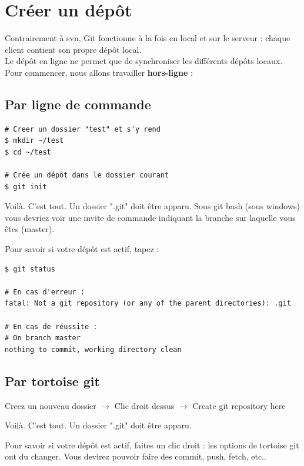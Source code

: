 \section{Créer un dépôt}

Contrairement à \acl{svn}, Git fonctionne à la fois en local et sur le serveur : chaque client contient son propre dépôt local.\\
Le dépôt en ligne ne permet que de synchroniser les différents dépôts locaux.\\

Pour commencer, nous allons travailler \textbf{hors-ligne} :

\subsection*{Par ligne de commande}
\begin{verbatim}
# Creer un dossier "test" et s'y rend
$ mkdir ~/test
$ cd ~/test

# Crée un dépôt dans le dossier courant
$ git init
\end{verbatim}

Voilà. C'est tout. Un dossier ".git" doit être apparu.
Sous git bash (sous windows) vous devriez voir une invite de commande indiquant la branche sur laquelle vous êtes (master).

Pour savoir si votre dépôt est actif, tapez :
\begin{verbatim}
$ git status

# En cas d'erreur :
fatal: Not a git repository (or any of the parent directories): .git

# En cas de réussite :
# On branch master
nothing to commit, working directory clean
\end{verbatim}

\subsection*{Par tortoise git}
Creez un nouveau dossier $\rightarrow$ Clic droit dessus $\rightarrow$ Create git repository here

Voilà. C'est tout. Un dossier ".git" doit être apparu.

Pour savoir si votre dépôt est actif, faites un clic droit : les options de tortoise git ont du changer.
Vous devirez pouvoir faire des commit, push, fetch, etc..

